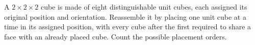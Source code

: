 A $2\times2\times2$ cube is made of eight distinguishable unit cubes, each assigned its original position and orientation. Reassemble it by placing one unit cube at a time in its assigned position, with every cube after the first required to share a face with an already placed cube. Count the possible placement orders.
